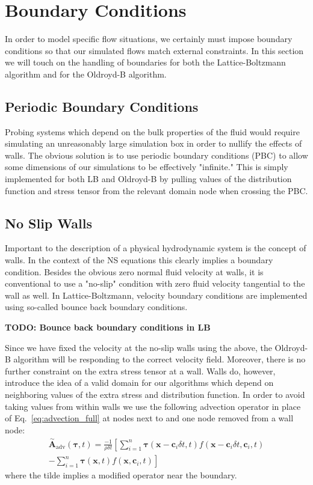 \section{Boundary Conditions}

In order to model specific flow situations, we certainly must impose boundary conditions so that our simulated flows match external constraints. In this section we will touch on the handling of boundaries for both the Lattice-Boltzmann algorithm and for the Oldroyd-B algorithm.

\subsection{Periodic Boundary Conditions}

Probing systems which depend on the bulk properties of the fluid would require simulating an unreasonably large simulation box in order to nullify the effects of walls. The obvious solution is to use periodic boundary conditions (PBC) to allow some dimensions of our simulations to be effectively "infinite." This is simply implemented for both LB and Oldroyd-B by pulling values of the distribution function and stress tensor from the relevant domain node when crossing the PBC.

\subsection{No Slip Walls}
Important to the description of a physical hydrodynamic system is the concept of walls. In the context of the NS equations this clearly implies a boundary condition. Besides the obvious zero normal fluid velocity at walls, it is conventional to use a "no-slip" condition with zero fluid velocity tangential to the wall as well. In Lattice-Boltzmann, velocity boundary conditions are implemented using so-called bounce back boundary conditions. 

\textbf{TODO: Bounce back boundary conditions in LB}

Since we have fixed the velocity at the no-slip walls using the above, the Oldroyd-B algorithm will be responding to the correct velocity field. Moreover, there is no further constraint on the extra stress tensor at a wall. Walls do, however, introduce the idea of a valid domain for our algorithms which depend on neighboring values of the extra stress and distribution function. In order to avoid taking values from within walls we use the following advection operator in place of Eq.~\eqref{eq:advection_full} at nodes next to and one node removed from a wall node:
\begin{multline}\label{eq:near_boundary_advection_1}
\overset{\sim}{\bm{A}}_{\mathrm{adv}}(\bm{\tau},t)=  \frac{-1}{\rho \delta t}\left[\sum_{i=1}^n\bm{\tau}(\bm{x}-\bm{c}_i\delta t,t)f(\bm{x} - \bm{c}_i\delta t, \bm{c}_i,t)\right. \\
-\left.\sum_{i=1}^n\bm{\tau}(\bm{x},t)f(\bm{x}, \bm{c}_i,t)\right]
\end{multline}
where the tilde implies a modified operator near the boundary.

